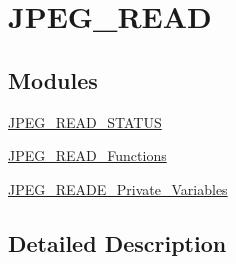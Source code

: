 \hypertarget{group___j_p_e_g___r_e_a_d}{}\section{J\+P\+E\+G\+\_\+\+R\+E\+AD}
\label{group___j_p_e_g___r_e_a_d}
\subsection*{Modules}
\begin{DoxyCompactItemize}
\item 
\hyperlink{group___j_p_e_g___r_e_a_d___s_t_a_t_u_s}{J\+P\+E\+G\+\_\+\+R\+E\+A\+D\+\_\+\+S\+T\+A\+T\+US}
\item 
\hyperlink{group___j_p_e_g___r_e_a_d___functions}{J\+P\+E\+G\+\_\+\+R\+E\+A\+D\+\_\+\+Functions}
\item 
\hyperlink{group___j_p_e_g___r_e_a_d_e___private___variables}{J\+P\+E\+G\+\_\+\+R\+E\+A\+D\+E\+\_\+\+Private\+\_\+\+Variables}
\end{DoxyCompactItemize}


\subsection{Detailed Description}

